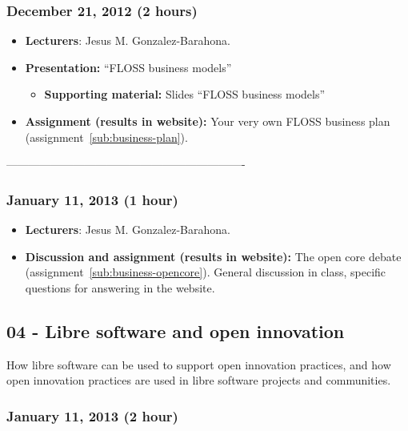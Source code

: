 \documentclass[a4paper]{article}
\begin{document}
\subsubsection{December 21, 2012 (2 hours)}

\begin{itemize}
\item \textbf{Lecturers}: Jesus M. Gonzalez-Barahona.
\item \textbf{Presentation:} ``FLOSS business models''
  \begin{itemize}
  \item \textbf{Supporting material:} Slides ``FLOSS business models''
  \end{itemize}
\item \textbf{Assignment (results in website):} Your very own FLOSS
  business plan (assignment~\ref{sub:business-plan}).
\end{itemize}

----------------------------------------------------------------
\subsubsection{January 11, 2013 (1 hour)}

\begin{itemize}
\item \textbf{Lecturers}: Jesus M. Gonzalez-Barahona.
\item \textbf{Discussion and assignment (results in website):} The open core debate (assignment~\ref{sub:business-opencore}). General discussion in class, specific questions for answering in the website.
\end{itemize}


\subsection{04 - Libre software and open innovation}

How libre software can be used to support open innovation practices, and how open innovation practices are used in libre software projects and communities.

\subsubsection{January 11, 2013 (2 hour)}
\end{document}
